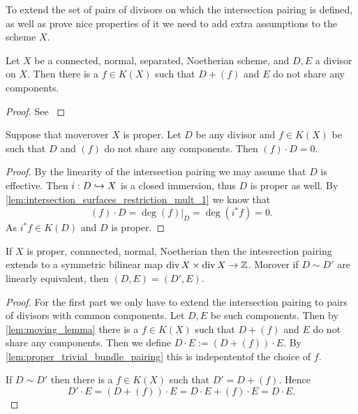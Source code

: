 To extend the set of pairs of divisors on which the intersection pairing is defined, as well as prove nice properties of it we need to add extra assumptions to the scheme $X$. 


\begin{lemma}\label{lem:moving_lemma}
	Let $X$ be a connected, normal, separated, Noetherian scheme, and $D, E$ a divisor on $X$. 
	Then there is a $f \in K(X)$ such that $D + (f)$ and $E$ do not share any components. 
\end{lemma}
\begin{proof}
	See \cite[cor.\ 9.1.10]{liuAlgebraicGeometryArithmetic2002}
\end{proof}

\begin{lemma}\label{lem:proper_trivial_bundle_pairing}
	Suppose that moverover $X$ is proper. 
	Let  $D$ be any divisor and $f \in K(X)$ be such that $D$ and $(f)$ do not share any components. 
	Then $(f)\cdot D = 0$. 
\end{lemma}
\begin{proof}
	By the linearity of the intersection pairing we may assume that $D$ is effective. 
	Then $ i: D \hookrightarrow X$ is a closed immersion, thus $D$ is proper as well. By \cref{lem:intersection_surfaces_restriction_mult_1} we know that \[
		(f)\cdot D = \deg (f)|_D = \deg (i^* f) = 0
	.\] 
	As $i^* f \in K(D)$ and $D$ is proper. 
\end{proof}

\begin{proposition}\label{prop:intersection_pairing_proper_model}
	If $X$ is proper, connnected, normal, Noetherian then the intesrection pairing extends to a symmetric bilinear map $\operatorname{div} X \times  \operatorname{div} X \to \mathbb{Z}$. 
	Morover if $D\sim D'$ are linearly equivalent, then $(D, E) = (D', E)$.
\end{proposition}
\begin{proof}
	For the first part we only have to extend the intersection pairing to pairs of divisors with common components. 
	Let $D, E$ be such components. 
	Then by \cref{lem:moving_lemma} there is a $f \in K(X)$ such that $D + (f)$ and $E$ do not share any components. 
	Then we define $D\cdot E := (D + (f))\cdot E$. 
	By \cref{lem:proper_trivial_bundle_pairing} this is indepententof the choice of $f$. 

	If $D \sim D'$ then there is a $f \in K(X)$ such that $D' = D + (f)$. 
	Hence \[
		D'\cdot E = (D + (f))\cdot E = D\cdot E + (f)\cdot E = D\cdot E
	.\] 
\end{proof}



